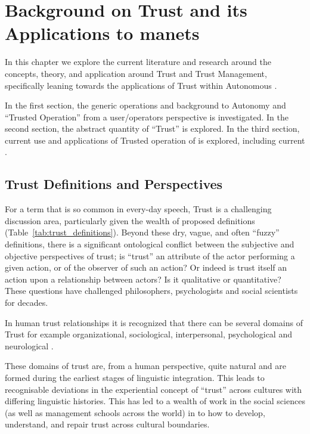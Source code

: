 \def\ChapterTitle{Background on Trust and its Applications to \gls{manet}s} %
\ifx\ifthesis\undefined

\else
\chapter{\ChapterTitle}
\label{Chapter\thechapter}
\fi
In this chapter we explore the current literature and research around the concepts, theory, and application around Trust and Trust Management, specifically leaning towards the applications of Trust within Autonomous .

In the first section, the generic operations and background to Autonomy and ``Trusted Operation'' from a user/operators perspective is investigated. 
In the second section, the abstract quantity of ``Trust'' is explored.
In the third section, current use and applications of Trusted operation of  is explored, including current .


\section{Trust Definitions and Perspectives}

For a term that is so common in every-day speech, Trust is a challenging discussion area, particularly given the wealth of proposed definitions (Table~\ref{tab:trust_definitions}).
Beyond these dry, vague, and often ``fuzzy'' definitions, there is a significant ontological conflict between the subjective and objective perspectives of trust; is ``trust'' an attribute of the actor performing a given action, or of the observer of such an action? Or indeed is trust itself an action upon a relationship between actors? Is it qualitative or quantitative? These questions have challenged philosophers, psychologists and social scientists for decades.

In human trust relationships it is recognized that there can be several domains of Trust for example organizational, sociological, interpersonal, psychological and neurological \cite{Lee2004}.

These domains of trust are, from a human perspective, quite natural and are formed during the earliest stages of linguistic integration.
This leads to recognisable deviations in the experiential concept of ``trust'' across cultures with differing linguistic histories.
This has led to a wealth of work in the social sciences (as well as management schools across the world) in to how to develop, understand, and repair trust across cultural boundaries.\cite{Okumura2011} 

